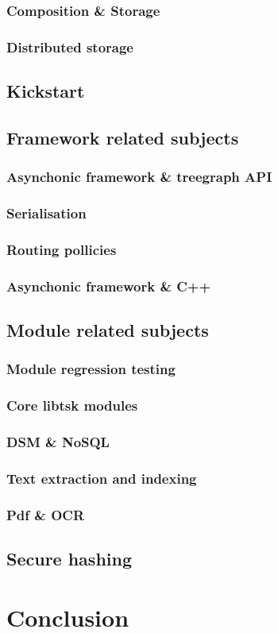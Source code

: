 \subsubsection{Composition \& Storage}
\subsubsection{Distributed storage}
\subsection{Kickstart}
\subsection{Framework related subjects}
\subsubsection{Asynchonic framework \& treegraph API}
\subsubsection{Serialisation}
\subsubsection{Routing pollicies}
\subsubsection{Asynchonic framework \& C++}
\subsection{Module related subjects}
\subsubsection{Module regression testing}
\subsubsection{Core libtsk modules}
\subsubsection{DSM \& NoSQL}
\subsubsection{Text extraction and indexing}
\subsubsection{Pdf \& OCR}
\subsection{Secure hashing}
\section{Conclusion}


